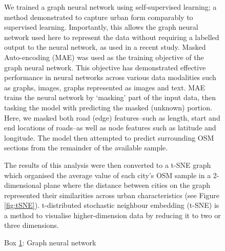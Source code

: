 \documentclass[preprint,10pt]{elsarticle} %
\begin{document}
\begin{figure}
{{We trained a graph neural network using self-supervised learning; a method demonstrated to capture urban form comparably to supervised learning\cite{seneviratne2021self}. Importantly, this allows the graph neural network used here to represent the data without requiring a labelled output to the neural network, as used in a recent study\cite{Thompson2020}. Masked Auto-encoding (MAE) was used as the training objective of the graph neural network. This objective has demonstrated effective performance in neural networks across various data modalities such as graphs\cite{hou2022graphmae}, images\cite{he2022masked}, graphs represented as images\cite{seneviratne2022self} and text\cite{devlin2018bert}. MAE trains the neural network by `masking' part of the input data, then tasking the model with predicting the masked (unknown) portion. Here, we masked both road (edge) features--such as length, start and end locations of roads--as well as node features such as latitude and longitude. The model then attempted to predict surrounding OSM sections from the remainder of the available sample. 

The results of this analysis were then converted to a t-SNE\cite{scikit-learn} graph which organised the average value of each city's OSM sample in a 2-dimensional plane where the distance between cities on the graph represented their similarities across urban characteristics (see Figure \ref{fig:tSNE}). t-distributed stochastic neighbour embedding (t-SNE) is a method to visualise higher-dimension data by reducing it to two or three dimensions.
}}
\captionsetup{labelformat=empty}
\caption{Box \ref{box:gnn}: Graph neural network}\label{box:gnn}
\end{figure}
\end{document}

